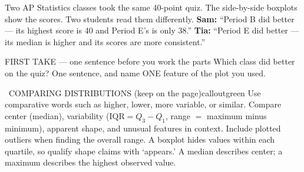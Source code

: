 \documentclass[11pt]{article}
\begin{document}
Two AP Statistics classes took the same 40-point quiz. The side-by-side boxplots show the scores. Two students read them differently. \textbf{Sam:} ``Period B did better --- its highest score is 40 and Period E's is only 38.'' \textbf{Tia:} ``Period E did better --- its median is higher and its scores are more consistent.''\par
\begin{center}
\end{center}
\begin{firsttakebox}{FIRST TAKE --- one sentence before you work the parts}
Which class did better on the quiz? One sentence, and name ONE feature of the plot you used.\par
{}
\end{firsttakebox}

\begin{callout}{\IconBook\ COMPARING DISTRIBUTIONS (keep on the page)}{calloutgreen}
Use comparative words such as higher, lower, more variable, or similar. Compare center (median), variability ($\mathrm{IQR}=Q_3-Q_1$, range $=$ maximum minus minimum), apparent shape, and unusual features in context. Include plotted outliers when finding the overall range. A boxplot hides values within each quartile, so qualify shape claims with `appears.' A median describes center; a maximum describes the highest observed value.
\end{callout}
\end{document}
